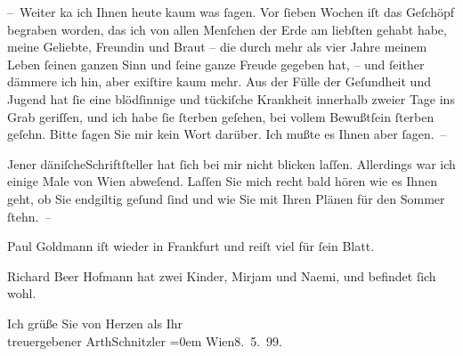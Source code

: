 \pstart
           – Weiter ka{\geminationn} ich Ihnen heute kaum was{ }ſagen. Vor{ }ſieben
               Wochen iſt das Geſchöpf
               begraben worden, das ich von allen {\pb}Menſchen der
               Erde am liebſten gehabt habe, meine Geliebte, Freundin und Braut – die durch mehr als
               vier Jahre meinem Leben{ }ſeinen ganzen Sinn und{ }ſeine ganze Freude gegeben hat, – und{ }ſeither dämmere ich hin, aber exiſtire kaum mehr. Aus der Fülle der Geſundheit und
               Jugend hat{ }ſie eine blödſinnige und tückiſche Krankheit innerhalb zweier Tage ins
               Grab geriſſen, und ich habe{ }ſie{ }ſterben geſehen, bei vollem Bewußt{\pb}ſein{ }ſterben geſehn. Bitte{ }ſagen Sie mir kein Wort
               darüber. Ich mußte es Ihnen aber{ }ſagen. –\pend
           
\pstart
           Jener däniſcheSchriftſteller hat{ }ſich bei
               mir nicht blicken laſſen. Allerdings war ich einige Male von Wien abweſend. Laſſen Sie mich recht bald hören wie es Ihnen
               geht, ob Sie endgiltig geſund{ }ſind und wie Sie mit Ihren Plänen für den Sommer{ }ſtehn. –\pend
           
\pstart
           Paul Goldmann iſt wieder in Frankfurt und reiſt viel für{ }ſein Blatt.\pend
           
\pstart
           {\pb}Richard Beer Hofmann hat zwei Kinder, Mirjam und Naemi, und befindet{ }ſich wohl.\pend
           
\pstart
           Ich grüße Sie von Herzen als Ihr{\\[\baselineskip]}treuergebener
                  \spacefill\mbox{ArthSchnitzler}\pend
           \leftskip=0em{}
\pstart
           Wien8. 5. 99.\pend
           \endnumbering{}  \newcommand{\dateiname}{L00915}\newcommand{\titel}{Arthur Schnitzler an Georg Brandes, 8. 5. 1899}\newcommand{\editorInnen}{Martin Anton Müller und Gerd-Hermann Susen}
